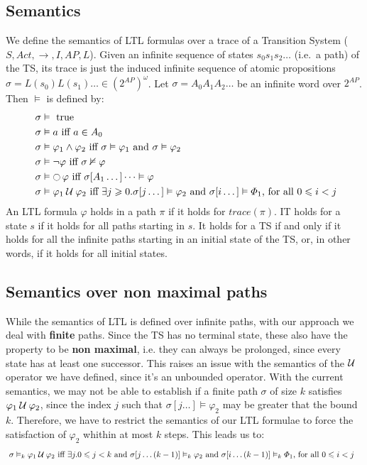 \documentclass{article}
\begin{document}
\subsection*{Semantics}
We define the semantics of LTL formulas over a trace of a Transition System ($S, Act, \rightarrow, I, AP, L$). 
Given an infinite sequence of states $s_0s_1s_2 \dots$ (i.e.~a path) of the TS, 
its trace is just the induced infinite sequence of atomic propositions $ \sigma = L(s_0)L(s_1) \dots \in (2^{AP})^{\omega}$.
Let $\sigma = A_0A_1A_2 \dots$ be an infinite word over $2^{AP}$. Then $\vDash$ is defined by:
\begin{align*}
    &\; \sigma \vDash \text{ true} \\
    &\; \sigma \vDash a \text{ iff } a \in A_0 \\
    &\; \sigma \vDash \varphi_1 \land \varphi_2 \text{ iff } \sigma \vDash \varphi_1 \text{ and } \sigma \vDash \varphi_2 \\
    &\; \sigma \vDash \neg \varphi \text{ iff } \sigma \nvDash \varphi \\
    &\; \sigma \vDash \mathop{\ocircle}{\varphi} \text{ iff } \sigma [A_1 \dots] \dots \vDash \varphi \\
    &\; \sigma \vDash \varphi_1 \mathbin{\mathcal{U}} \varphi_2 \text{ iff } \exists j \geqslant 0 .  \sigma [ j \dots ] \vDash \varphi_2 \text{ and } \sigma [ i \dots ] \vDash \varPhi_1 \text{, for all } 0 \leqslant  i < j
\end{align*}
An LTL formula $\varphi$ holds in a path $\pi$ if it holds for $trace(\pi)$. 
IT holds for a state $s$ if it holds for all paths starting in $s$.
It holds for a TS if and only if it holds for all the infinite paths 
starting in an initial state of the TS, or, in other words, if it holds for all initial states.

\subsection*{Semantics over non maximal paths}
While the semantics of LTL is defined over infinite paths, with our approach we deal with \textbf{finite} paths. Since the TS has no terminal state, these also have the property to be \textbf{non maximal}, i.e. they can always be prolonged, since every state has at least one successor. This raises an issue with the semantics of the $\mathbin{\mathcal{U}}$ operator we have defined, since it's an unbounded operator. With the current semantics, we may not be able to establish if a finite path $\sigma$ of size $k$ satisfies $\varphi_1 \mathbin{\mathcal{U}} \varphi_2$, since the index $j$ such that $\sigma [ j \dots ] \vDash \varphi_2$ may be greater that the bound $k$. Therefore, we have to restrict the semantics of our LTL formulae to force the satisfaction of $\varphi_2$ whithin at most $k$ steps. This leads us to:
\begin{align*}
    &\; \sigma \vDash_k \varphi_1 \mathbin{\mathcal{U}} \varphi_2 \text{ iff } \exists j. 0 \leqslant j < k \text{ and }  \sigma [ j \dots (k-1)] \vDash_k \varphi_2 \text{ and } \sigma [ i \dots (k-1)] \vDash_k \varPhi_1 \text{, for all } 0 \leqslant  i < j
\end{align*}
\end{document}
